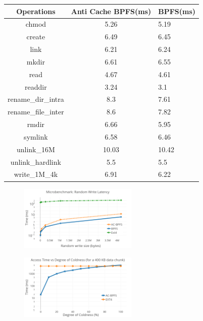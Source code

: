 \begin{table}[!t]
\begin{center}
{\footnotesize
\begin{tabular}{c|c|l}
\textbf{Operations} & \textbf{Anti Cache BPFS(ms)} & \textbf{BPFS(ms)} \\
\hline
chmod&5.26&5.19 \\
create&6.49&6.45 \\
link&6.21&6.24 \\
mkdir&6.61&6.55 \\
read&4.67&4.61 \\
readdir&3.24&3.1 \\
rename\_dir\_intra&8.3&7.61 \\
rename\_file\_inter&8.6&7.82 \\
rmdir&6.66&5.95 \\
symlink&6.58&6.46 \\
unlink\_16M&10.03&10.42 \\
unlink\_hardlink&5.5&5.5 \\
write\_1M\_4k&6.91&6.22 \\

\end{tabular}
}
\end{center}
\vspace{-0.1in}
\end{table}

\begin{figure}
\centering
\vspace{-0.2in}
\includegraphics[width=0.5\textwidth]{figs/write.png}
\vspace{-0.2in}
\end{figure}


\begin{figure}
\centering
\vspace{-0.2in}
\includegraphics[width=0.5\textwidth]{figs/coldness.png}
\vspace{-0.2in}
\end{figure}




